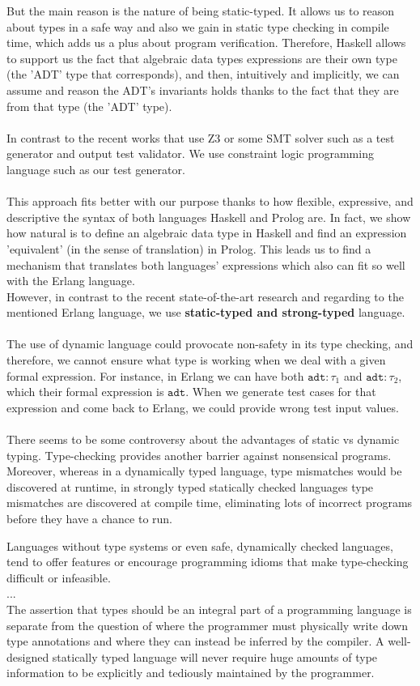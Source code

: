 \documentclass{report}
\theoremstyle{definition}
\theoremstyle{definition}
\begin{document}
But the main reason is the nature of being static-typed. It allows us to reason about types in a safe way and also we gain in static type checking in compile time, which adds us a plus about program verification. Therefore, Haskell allows to support us the fact that algebraic data types expressions are their own type (the 'ADT' type that corresponds), and then, intuitively and implicitly, we can assume and reason the ADT's invariants holds thanks to the fact that they are from that type (the 'ADT' type).\\\\
In contrast to the recent works that use Z3 or some SMT solver such as a test generator and output test validator. We use constraint logic programming language such as our test generator.\\\\
This approach fits better with our purpose thanks to how flexible, expressive, and descriptive the syntax of both languages Haskell and Prolog are. In fact, we show how natural is to define an algebraic data type in Haskell and find an expression 'equivalent' (in the sense of translation) in Prolog. This leads us to find a mechanism that translates both languages' expressions which also can fit so well with the Erlang language. \pagebreak \\
However, in contrast to the recent state-of-the-art research and regarding to the mentioned Erlang language, we use \textbf{static-typed and strong-typed} language.\\\\
The use of dynamic language could provocate non-safety in its type checking, and therefore, we cannot ensure what type is working when we deal with a given formal expression. For instance, in Erlang we can have both $\texttt{adt}:\tau_1$ and $\texttt{adt}:\tau_2$, which their formal expression is $\texttt{adt}$. When we generate test cases for that expression and come back to Erlang, we could provide wrong test input values.\\\\
There seems to be some controversy about the advantages of static vs dynamic typing. Type-checking provides another barrier against nonsensical programs. Moreover, whereas in a dynamically typed language,   type mismatches would be discovered at runtime, in strongly typed statically checked languages type mismatches are discovered at compile time, eliminating lots of incorrect programs before they have a chance to run.
\begin{displayquote}
	Languages without type systems or even safe, dynamically checked languages, tend to offer features or encourage programming idioms that make type-checking difficult or infeasible. \\ ... \\
	The assertion that types should be an integral part of a programming language is separate from the question of where the programmer must physically write down type annotations and where they can instead be inferred by the compiler. A well-designed statically typed language will never require huge amounts of type information to be explicitly and tediously maintained by the programmer. \cite{cpierce}
\end{displayquote}
\end{document}
